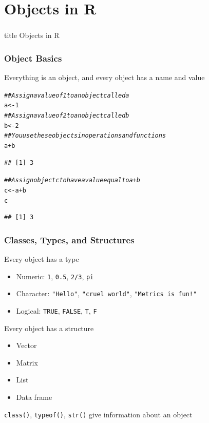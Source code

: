 \documentclass{beamer}\usepackage[]{graphicx}\usepackage[]{color}
\makeatletter
\newcommand{\hlnum}[1]{\textcolor[rgb]{0.686,0.059,0.569}{#1}}%
\newcommand{\hlcom}[1]{\textcolor[rgb]{0.678,0.584,0.686}{\textit{#1}}}%
\newcommand{\hlopt}[1]{\textcolor[rgb]{0,0,0}{#1}}%
\newcommand{\hlstd}[1]{\textcolor[rgb]{0.345,0.345,0.345}{#1}}%
\newcommand{\hlkwb}[1]{\textcolor[rgb]{0.69,0.353,0.396}{#1}}%
\newenvironment{kframe}{%
 \def\at@end@of@kframe{}%
 \ifinner\ifhmode%
  \def\at@end@of@kframe{\end{minipage}}%
  \begin{minipage}{\columnwidth}%
 \fi\fi%
 \def\FrameCommand##1{\hskip\@totalleftmargin \hskip-\fboxsep
 \colorbox{shadecolor}{##1}\hskip-\fboxsep
     \hskip-\linewidth \hskip-\@totalleftmargin \hskip\columnwidth}%
 \MakeFramed {\advance\hsize-\width
   \@totalleftmargin\z@ \linewidth\hsize
   \@setminipage}}%
 {\par\unskip\endMakeFramed%
 \at@end@of@kframe}
\newenvironment{knitrout}{}{} %
\makeatother
\begin{document}
\section{Objects in R}
\label{objects}
\begin{frame}\frametitle{}
    \vfill
    \centering
    \begin{beamercolorbox}[center]{title}
        \Large Objects in R
    \end{beamercolorbox}
    \vfill
\end{frame}

\begin{frame}[fragile]\frametitle{Object Basics}
    Everything is an object, and every object has a name and value
\begin{knitrout}\footnotesize
{}\color{fgcolor}\begin{kframe}
\begin{alltt}
\hlcom{## Assign a value of 1 to an object called a}
\hlstd{a} \hlkwb{<-} \hlnum{1}
\hlcom{## Assign a value of 2 to an object called b}
\hlstd{b} \hlkwb{<-} \hlnum{2}
\hlcom{## You use these objects in operations and functions}
\hlstd{a} \hlopt{+} \hlstd{b}
\end{alltt}
\begin{verbatim}
## [1] 3
\end{verbatim}
\begin{alltt}
\hlcom{## Assign object c to have a value equal to a + b}
\hlstd{c} \hlkwb{<-} \hlstd{a} \hlopt{+} \hlstd{b}
\hlstd{c}
\end{alltt}
\begin{verbatim}
## [1] 3
\end{verbatim}
\end{kframe}
\end{knitrout}
\end{frame}

\begin{frame}\frametitle{Classes, Types, and Structures}
    Every object has a type
    \begin{itemize}
        \item Numeric: \texttt{1}, \texttt{0.5}, \texttt{2/3}, \texttt{pi}
        \item Character: \texttt{"Hello"}, \texttt{"cruel world"}, \texttt{"Metrics is fun!"}
        \item Logical: \texttt{TRUE}, \texttt{FALSE}, \texttt{T}, \texttt{F}
    \end{itemize}
    \vspace{2ex}
    Every object has a structure
    \begin{itemize}
        \item Vector
        \item Matrix
        \item List
        \item Data frame
    \end{itemize}
    \vspace{2ex}
    \texttt{class()}, \texttt{typeof()}, \texttt{str()} give information about an object
\end{frame}
\end{document}
